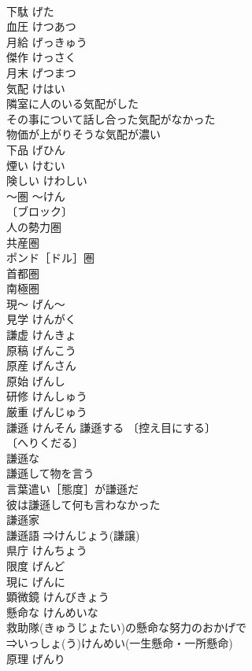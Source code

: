 \documentclass[8pt]{extreport}
\begin{document}
\begin{CJK}{UTF8}{min}
\\	下駄	げた	
\\	血圧	けつあつ	
\\	月給	げっきゅう	
\\	傑作	けっさく	
\\	月末	げつまつ	
\\	気配	けはい	
\\	隣室に人のいる気配がした 
\\	その事について話し合った気配がなかった 
\\	物価が上がりそうな気配が濃い 
\\	下品	げひん	
\\	煙い	けむい	
\\	険しい	けわしい	
\\	～圏	～けん	
\\	〔ブロック〕
\\	人の勢力圏 
\\	共産圏 
\\	ポンド［ドル］圏 
\\	首都圏 
\\	南極圏 
\\	現～	げん～	
\\	見学	けんがく	
\\	謙虚	けんきょ	
\\	原稿	げんこう	
\\	原産	げんさん	
\\	原始	げんし	
\\	研修	けんしゅう	
\\	厳重	げんじゅう	
\\	謙遜	けんそん	謙遜する 〔控え目にする〕
\\	〔へりくだる〕
\\	謙遜な 
\\	謙遜して物を言う 
\\	言葉遣い［態度］が謙遜だ 
\\	彼は謙遜して何も言わなかった 
\\	謙遜家 
\\	謙遜語 ⇒けんじょう(謙譲)
\\	県庁	けんちょう	
\\	限度	げんど	
\\	現に	げんに	
\\	顕微鏡	けんびきょう	
\\	懸命な	けんめいな	
\\	救助隊(きゅうじょたい)の懸命な努力のおかげで 
\\	⇒いっしょ(う)けんめい(一生懸命・一所懸命)
\\	原理	げんり	

\end{CJK}
\end{document}
